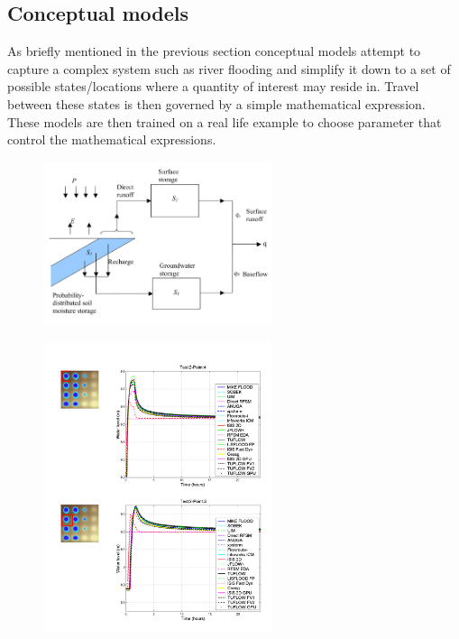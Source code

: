 \documentclass[11pt]{article}
\begin{document}
\subsection{Conceptual models}

 As briefly mentioned in the previous section conceptual models attempt to capture a complex system such as river flooding and simplify it down to a set of possible states/locations where a quantity of interest may reside in. Travel between these states is then governed by a simple mathematical expression. These models are then trained on a real life example to choose parameter that control the mathematical expressions.
 
 \begin{minipage}{0.5\textwidth}
    \begin{figure}[H]
        \centering
        \includegraphics[width=0.6\textwidth]{Figs/Concept.png}
        \label{fig:conceptual}
    \end{figure}
    \begin{figure}[H]
        \centering
        \includegraphics[width=0.6\textwidth]{Figs/EA_bench.png}
        \label{fig:eaBench}
    \end{figure}
\end{minipage}
\end{document}
